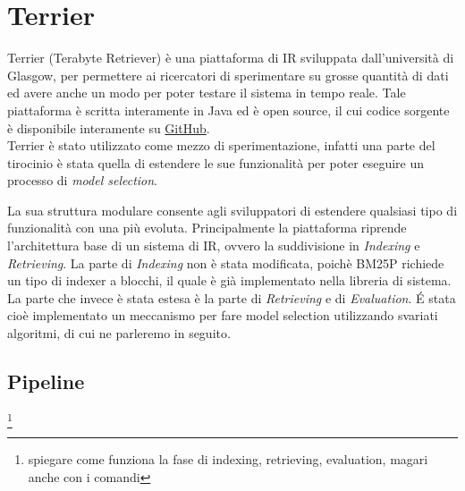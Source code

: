 \chapter{Terrier}
Terrier (Terabyte Retriever) è una piattaforma di IR sviluppata dall'università di Glasgow, per permettere ai ricercatori di sperimentare su
grosse quantità di dati ed avere anche un modo per poter testare il sistema in tempo reale.
Tale piattaforma è scritta interamente in Java ed è open source, il cui codice sorgente è disponibile
interamente su \href{https://github.com/terrier-org/terrier-core}{GitHub}.
\\
Terrier è stato utilizzato come mezzo di sperimentazione, infatti
una parte del tirocinio è stata quella di estendere le sue funzionalità per poter eseguire un processo
di \textit{model selection}.

La sua struttura modulare consente agli sviluppatori di estendere qualsiasi tipo di funzionalità con una
più evoluta.
Principalmente la piattaforma riprende l'architettura base di un sistema di IR, ovvero la suddivisione in
\textit{Indexing} e \textit{Retrieving}. La parte di \textit{Indexing} non è stata modificata, poichè
BM25P richiede un tipo di indexer a blocchi, il quale è già implementato nella libreria di sistema.
La parte che invece è stata estesa è la parte di \textit{Retrieving} e di \textit{Evaluation}. \'E stata
cioè implementato un meccanismo per fare model selection utilizzando svariati algoritmi, di cui
ne parleremo in seguito. 


\section{Pipeline}
\footnote{spiegare come funziona la fase di indexing, retrieving, evaluation, magari anche con i comandi}